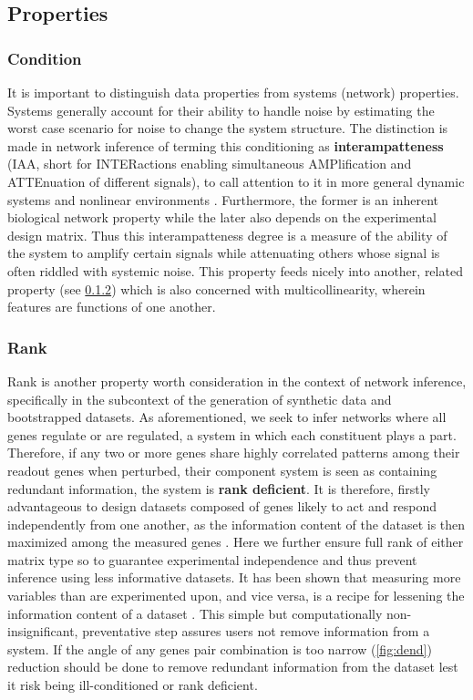 \subsection{Properties}
\label{sec:prop}
\subsubsection{Condition}
\label{sec:cond}
It is important to distinguish data properties from systems (network) properties. Systems generally account for their ability to handle noise by estimating the worst case scenario for noise to change the system structure. The distinction is made in network inference of terming this conditioning as \textbf{interampatteness} (IAA, short for INTERactions enabling simultaneous AMPlification and ATTEnuation of different signals), to call attention to it in more general dynamic systems and nonlinear environments \citep{nordling2009interampatteness}. Furthermore, the former is an inherent biological network property while the later also depends on the experimental design matrix.  Thus this interampatteness degree is a measure of the ability of the system to amplify certain signals while attenuating others whose signal is often riddled with systemic noise. This property feeds nicely into another, related property (see \cref{sec:rank}) which is also concerned with multicollinearity, wherein features are functions of one another.

\subsubsection{Rank}
\label{sec:rank}
Rank is another property worth consideration in the context of network inference, specifically in the subcontext of the generation of synthetic data and bootstrapped datasets. As aforementioned, we seek to infer networks where all genes regulate or are regulated, \ie a system in which each constituent plays a part. Therefore, if any two or more genes share highly correlated patterns among their readout genes when perturbed, their component system is seen as containing redundant information, \ie the system is \textbf{rank deficient}. It is therefore, firstly advantageous to design datasets composed of genes likely to act and respond independently from one another, as the information content of the dataset is then maximized among the measured genes \citep{subramanian2017next}. Here we further ensure full rank of either matrix type so to guarantee experimental independence and thus prevent inference using less informative datasets. It has been shown that measuring more variables than are experimented upon, and vice versa, is a recipe for lessening the information content of a dataset \citep{Nordling2013}. This simple but computationally non-insignificant, preventative step assures users not remove information from a system.  If the angle of any genes pair combination is too narrow (\cref{fig:dend}) reduction should be done to remove redundant information from the dataset lest it risk being ill-conditioned or rank deficient.

